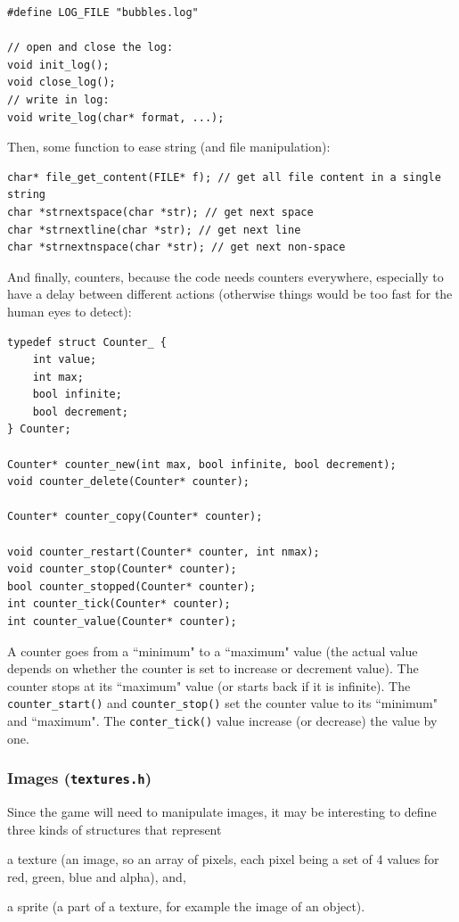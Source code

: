 \documentclass[12pt,a4paper]{article}
\newcommand{\cc}[1]{\texttt{#1}}
\begin{document}
\begin{verbatim}
#define LOG_FILE "bubbles.log"

// open and close the log:
void init_log();
void close_log();
// write in log:
void write_log(char* format, ...);
\end{verbatim}

Then, some function to ease string (and file manipulation):

\begin{verbatim}
char* file_get_content(FILE* f); // get all file content in a single string
char *strnextspace(char *str); // get next space
char *strnextline(char *str); // get next line
char *strnextnspace(char *str); // get next non-space
\end{verbatim}

And finally, counters, because the code needs counters everywhere, especially to have a delay between different actions (otherwise things would be too fast for the human eyes to detect): 

\begin{verbatim}
typedef struct Counter_ {
    int value;
    int max;
    bool infinite;
    bool decrement;
} Counter;

Counter* counter_new(int max, bool infinite, bool decrement);
void counter_delete(Counter* counter);

Counter* counter_copy(Counter* counter);

void counter_restart(Counter* counter, int nmax);
void counter_stop(Counter* counter);
bool counter_stopped(Counter* counter);
int counter_tick(Counter* counter);
int counter_value(Counter* counter);
\end{verbatim}

A counter goes from a ``minimum" to a ``maximum" value (the actual value depends on whether the counter is set to increase or decrement value). The counter stops at its ``maximum" value (or starts back if it is infinite). The \cc{counter_start()} and \cc{counter_stop()} set the counter value to its ``minimum" and ``maximum". The \cc{conter_tick()} value increase (or decrease) the value by one.

\subsubsection{Images (\texttt{textures.h})}

Since the game will need to manipulate images, it may be interesting to define three kinds of structures that represent \begin{inparaenum}[i)]
\item a texture (an image, so an array of pixels, each pixel being a set of 4 values for red, green, blue and alpha), and,
\item a sprite (a part of a texture, for example the image of an object).
\end{inparaenum}
\end{document}
